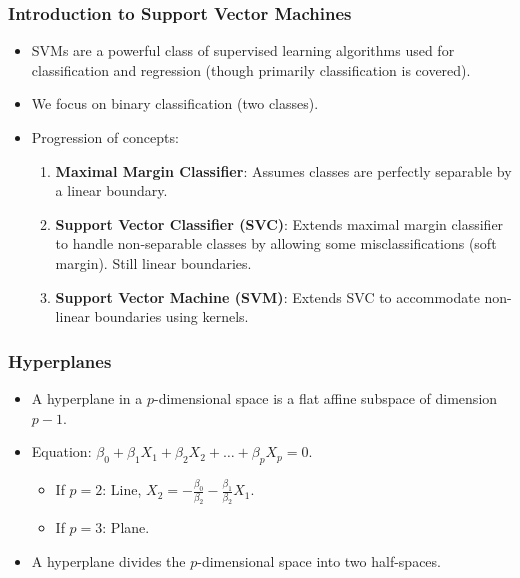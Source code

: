 \documentclass[12pt,a4paper]{article}
\begin{document}
    \subsubsection{Introduction to Support Vector Machines}
        \begin{itemize}
            \item SVMs are a powerful class of supervised learning algorithms used for classification and regression (though primarily classification is covered).
            \item We focus on binary classification (two classes).
            \item Progression of concepts:
                \begin{enumerate}
                    \item \textbf{Maximal Margin Classifier}: Assumes classes are perfectly separable by a linear boundary.
                    \item \textbf{Support Vector Classifier (SVC)}: Extends maximal margin classifier to handle non-separable classes by allowing some misclassifications (soft margin). Still linear boundaries.
                    \item \textbf{Support Vector Machine (SVM)}: Extends SVC to accommodate non-linear boundaries using kernels.
                \end{enumerate}
        \end{itemize}

    \subsubsection{Hyperplanes }
        \begin{itemize}
            \item A hyperplane in a $p$-dimensional space is a flat affine subspace of dimension $p-1$.
            \item Equation: $\beta_0 + \beta_1 X_1 + \beta_2 X_2 + \dots + \beta_p X_p = 0$.
                \begin{itemize}
                    \item If $p=2$: Line, $X_2 = -\frac{\beta_0}{\beta_2} - \frac{\beta_1}{\beta_2} X_1$.
                    \item If $p=3$: Plane.
                \end{itemize}
            \item A hyperplane divides the $p$-dimensional space into two half-spaces.
        \end{itemize}
\end{document}
